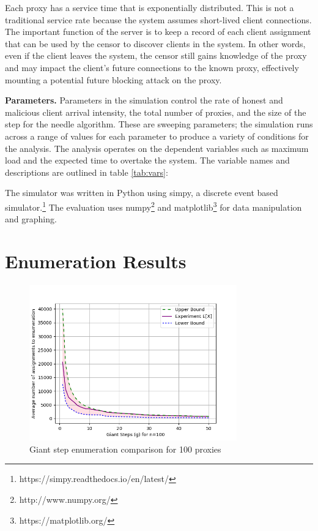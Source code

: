 Each proxy has a service time that is exponentially distributed. This is not a traditional service rate because the system assumes short-lived client connections. The important function of the server is to keep a record of each client assignment that can be used by the censor to discover clients in the system. In other words, even if the client leaves the system, the censor still gains knowledge of the proxy and may impact the client's future connections to the known proxy, effectively mounting a potential future blocking attack on the proxy.

\textbf{Parameters.} Parameters in the simulation control the rate of honest and malicious client arrival intensity, the total number of proxies, and the size of the step for the needle algorithm. These are sweeping parameters; the simulation runs across a range of values for each parameter to produce a variety of conditions for the analysis. The analysis operates on the dependent variables such as maximum load and the expected time to overtake the system. The variable names and descriptions are outlined in table \ref{tab:vars}:

The simulator was written in Python using simpy, a discrete event based simulator.\footnote{https://simpy.readthedocs.io/en/latest/} The evaluation uses numpy\footnote{http://www.numpy.org/} and matplotlib\footnote{https://matplotlib.org/} for data manipulation and graphing.

\section{Enumeration Results}

\begin{figure}[h!]
\centering
     \includegraphics[width=0.8\textwidth]{fig/needle_expected_value_n_100.png}
    \caption{Giant step enumeration comparison for 100 proxies}

    \label{fig:gsn100}
\end{figure}

